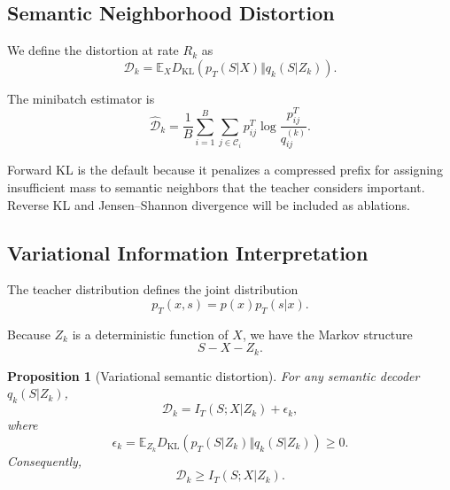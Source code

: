 \documentclass[11pt]{article}
\newtheorem{proposition}{Proposition}
\newcommand{\KL}{D_{\mathrm{KL}}}
\newcommand{\E}{\mathbb{E}}
\newcommand{\cD}{\mathcal{D}}
\begin{document}
\subsection{Semantic Neighborhood Distortion}

We define the distortion at rate $R_k$ as
\begin{equation}
\boxed{
    \cD_k
    =
    \E_X
    \KL
    \left(
        p_T(S|X)
        \Vert
        q_k(S|Z_k)
    \right).
}
\label{eq:snd}
\end{equation}

The minibatch estimator is
\begin{equation}
    \widehat{\cD}_k
    =
    \frac{1}{B}
    \sum_{i=1}^{B}
    \sum_{j\in\mathcal C_i}
    p_{ij}^{T}
    \log
    \frac{
        p_{ij}^{T}
    }{
        q_{ij}^{(k)}
    }.
\end{equation}

Forward KL is the default because it penalizes a compressed prefix for assigning insufficient mass to semantic neighbors that the teacher considers important.
Reverse KL and Jensen--Shannon divergence will be included as ablations.


\subsection{Variational Information Interpretation}

The teacher distribution defines the joint distribution
\begin{equation}
    p_T(x,s)=p(x)p_T(s|x).
\end{equation}

Because $Z_k$ is a deterministic function of $X$, we have the Markov structure
\begin{equation}
    S-X-Z_k.
\end{equation}

\begin{proposition}[Variational semantic distortion]
\label{prop:variational}
For any semantic decoder $q_k(S|Z_k)$,
\begin{equation}
\boxed{
    \cD_k
    =
    I_T(S;X|Z_k)
    +
    \epsilon_k,
}
\label{eq:variational-decomposition}
\end{equation}
where
\begin{equation}
    \epsilon_k
    =
    \E_{Z_k}
    \KL
    \left(
        p_T(S|Z_k)
        \Vert
        q_k(S|Z_k)
    \right)
    \geq 0.
\end{equation}
Consequently,
\begin{equation}
    \cD_k \geq I_T(S;X|Z_k).
\end{equation}
\end{proposition}
\end{document}
